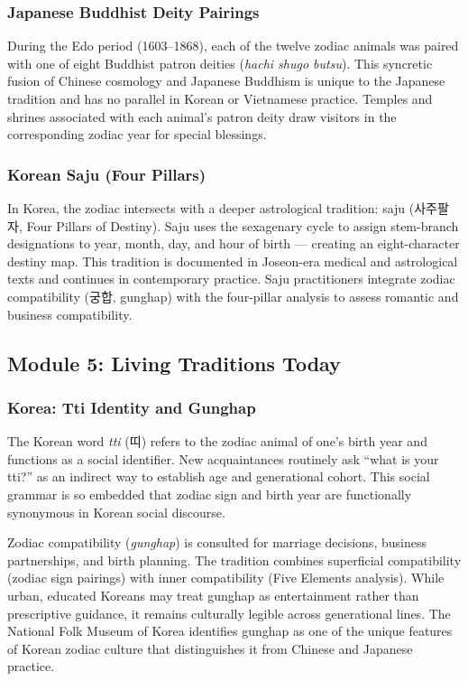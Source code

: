 \documentclass[11pt,letterpaper]{article}
\begin{document}
\subsubsection{Japanese Buddhist Deity Pairings}

During the Edo period (1603--1868), each of the twelve zodiac animals was paired with one of eight Buddhist patron deities (\textit{hachi shugo butsu}). This syncretic fusion of Chinese cosmology and Japanese Buddhism is unique to the Japanese tradition and has no parallel in Korean or Vietnamese practice. Temples and shrines associated with each animal's patron deity draw visitors in the corresponding zodiac year for special blessings.

\subsubsection{Korean Saju (Four Pillars)}

In Korea, the zodiac intersects with a deeper astrological tradition: saju (사주팔자, Four Pillars of Destiny). Saju uses the sexagenary cycle to assign stem-branch designations to year, month, day, and hour of birth --- creating an eight-character destiny map. This tradition is documented in Joseon-era medical and astrological texts and continues in contemporary practice. Saju practitioners integrate zodiac compatibility (궁합, gunghap) with the four-pillar analysis to assess romantic and business compatibility.

\subsection{Module 5: Living Traditions Today}

\subsubsection{Korea: Tti Identity and Gunghap}

The Korean word \textit{tti} (띠) refers to the zodiac animal of one's birth year and functions as a social identifier. New acquaintances routinely ask ``what is your tti?'' as an indirect way to establish age and generational cohort. This social grammar is so embedded that zodiac sign and birth year are functionally synonymous in Korean social discourse.

Zodiac compatibility (\textit{gunghap}) is consulted for marriage decisions, business partnerships, and birth planning. The tradition combines superficial compatibility (zodiac sign pairings) with inner compatibility (Five Elements analysis). While urban, educated Koreans may treat gunghap as entertainment rather than prescriptive guidance, it remains culturally legible across generational lines. The National Folk Museum of Korea identifies gunghap as one of the unique features of Korean zodiac culture that distinguishes it from Chinese and Japanese practice.
\end{document}
